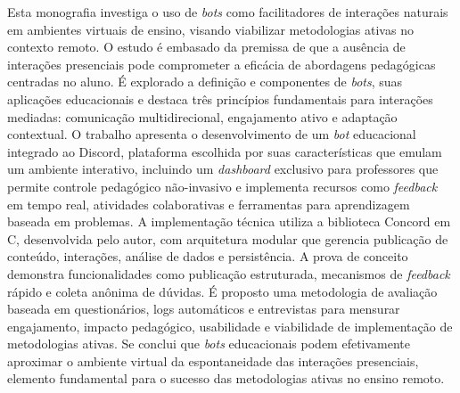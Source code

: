 \begin{resumo}

Esta monografia investiga o uso de \textit{bots} como facilitadores de
interações naturais em ambientes virtuais de ensino, visando viabilizar
metodologias ativas no contexto remoto. O estudo é embasado da premissa de que a
ausência de interações presenciais pode comprometer a eficácia de abordagens
pedagógicas centradas no aluno. É explorado a definição e componentes de
\textit{bots}, suas aplicações educacionais e destaca três princípios
fundamentais para interações mediadas: comunicação multidirecional, engajamento
ativo e adaptação contextual.  O trabalho apresenta o desenvolvimento de um
\textit{bot} educacional integrado ao Discord, plataforma escolhida por suas
características que emulam um ambiente interativo, incluindo um
\textit{dashboard} exclusivo para professores que permite controle pedagógico
não-invasivo e implementa recursos como \textit{feedback} em tempo real,
atividades colaborativas e ferramentas para aprendizagem baseada em problemas. A
implementação técnica utiliza a biblioteca Concord em C, desenvolvida pelo
autor, com arquitetura modular que gerencia publicação de conteúdo, interações,
análise de dados e persistência. A prova de conceito demonstra funcionalidades
como publicação estruturada, mecanismos de \textit{feedback} rápido e coleta
anônima de dúvidas. É proposto uma metodologia de avaliação baseada em
questionários, logs automáticos e entrevistas para mensurar engajamento, impacto
pedagógico, usabilidade e viabilidade de implementação de metodologias ativas.
Se conclui que \textit{bots} educacionais podem efetivamente aproximar o
ambiente virtual da espontaneidade das interações presenciais, elemento
fundamental para o sucesso das metodologias ativas no ensino remoto.

\end{resumo}
